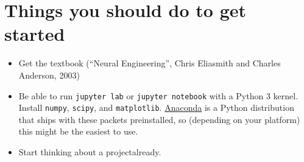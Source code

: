 \documentclass[10pt,letterpaper,oneside]{article}
\begin{document}
\newpage

\section{Things you should do to get started}

\begin{itemize}
	\item Get the textbook (\enquote{Neural Engineering}, Chris Eliasmith and Charles Anderson, 2003)
	\item Be able to run \texttt{jupyter lab} or \texttt{jupyter notebook} with a Python 3 kernel. Install \texttt{numpy}, \texttt{scipy}, and \texttt{matplotlib}. \href{https://www.anaconda.com/distribution/}{Anaconda} is a Python distribution that ships with these packets preinstalled, so (depending on your platform) this might be the easiest to use.
	\item Start thinking about a project\textellipsis already.
\end{itemize}

\printbibliography
\end{document}
